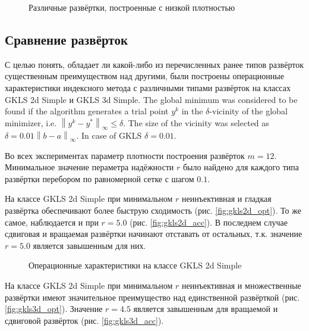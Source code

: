 \begin{figure}[ht]
    \centering
    \caption{Различные развёртки, построенные с низкой плотностью}
\end{figure}

\subsection{Сравнение развёрток}
\label{sec:seq_comp}
\begin{Russian}
С целью понять, обладает ли какой-либо из перечисленных ранее типов развёрток существенным преимуществом над другими,
были построены операционные характеристики индексного метода с различными типами развёрток на классах
GKLS 2d Simple и GKLS 3d Simple. The global minimum was considered to be found if the algorithm generates a
trial point $y^k$ in the $\delta$-vicinity of the global minimizer, i.e. $\left\|y^k-y^\ast\right\|_\infty\leq\delta$.
The size of the vicinity was selected as $\delta = 0.01\left\|b-a\right\|_\infty$. In case of GKLS $\delta=0.01$.

Во всех экспериментах параметр плотности построения развёрток $m=12$. Минимальное значение пераметра надёжности \(r\) было найдено
для каждого типа развёртки перебором по равномерной сетке с шагом \(0.1\).

На классе GKLS 2d Simple при минимальном \(r\) неинъективная и гладкая развёртка обеспечивают более быструю сходимость
(рис. \ref{fig:gkls2d_opt}). То же самое, наблюдается и при \(r=5.0\) (рис. \ref{fig:gkls2d_acc}). В последнем случае сдвиговая и
вращаемая развёртки начинают отставать от остальных, т.к. значение \(r=5.0\) является завышенным для них.
\begin{figure}[ht]
    \centering
    \caption{Операционные характеристики на классе GKLS 2d Simple}
\end{figure}

На классе GKLS 2d Simple при минимальном \(r\) неинъективная и множественные развёртки имеют значительное
преимущество над единственной развёрткой (рис. \ref{fig:gkls3d_opt}). Значение \(r=4.5\) является завышенным для
вращаемой и сдвиговой развёрток (рис. \ref{fig:gkls3d_acc}).


\end{Russian}
